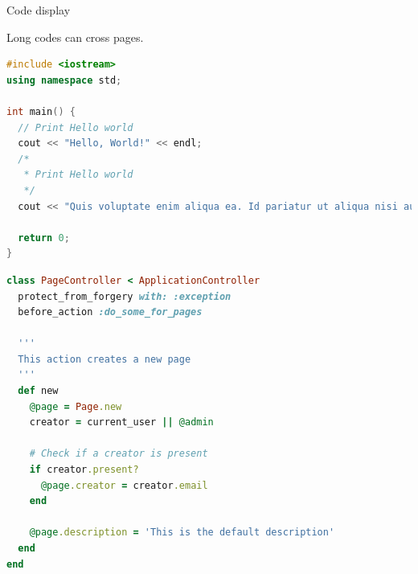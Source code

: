 \documentclass[11pt]{article}
\begin{document}
\begin{question}[50\%]{Code display}

  \begin{answer}
    Long codes can cross pages.

    \begin{lstlisting}[language=C++]
#include <iostream>
using namespace std;

int main() {
  // Print Hello world
  cout << "Hello, World!" << endl;
  /*
   * Print Hello world
   */
  cout << "Quis voluptate enim aliqua ea. Id pariatur ut aliqua nisi aute ea cupidatat. Excepteur veniam com";

  return 0;
}
    \end{lstlisting}

    \begin{lstlisting}[language=Ruby,style=ruby_on_rails, caption={A ruby on rails code sample}]
class PageController < ApplicationController
  protect_from_forgery with: :exception
  before_action :do_some_for_pages

  '''
  This action creates a new page
  '''
  def new
    @page = Page.new
    creator = current_user || @admin

    # Check if a creator is present
    if creator.present?
      @page.creator = creator.email
    end

    @page.description = 'This is the default description'
  end
end
    \end{lstlisting}
  \end{answer}
\end{question}
\end{document}
